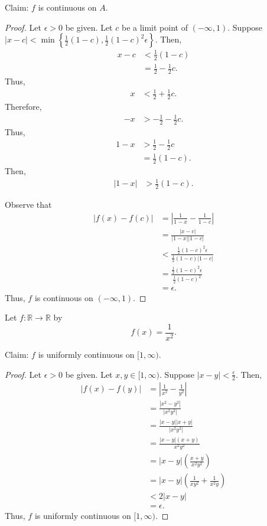 \documentclass[12pt]{article}
\begin{document}
\newpage
{} Claim: $f$ is continuous on $A$.
\begin{proof}
    Let $\epsilon > 0$ be given. Let $c$ be a limit point of $(-\infty, 1)$. Suppose $|x - c| < \min\left\{\frac12(1-c), \frac12(1-c)^2\epsilon\right\}$. Then,
    \begin{align*}
        x - c &< \frac12(1 - c) \\
              &= \frac12 - \frac12c.
    \end{align*} Thus,
    \begin{align*}
        x &< \frac12 + \frac12c.
    \end{align*} Therefore,
    \begin{align*}
        -x &> -\frac12 - \frac12c.
    \end{align*} Thus,
    \begin{align*}
        1 - x &> \frac12 - \frac12c \\
              &= \frac12(1-c).
    \end{align*} Then,
    \begin{align*}
        |1 - x| &> \frac12(1-c).
    \end{align*}

    Observe that
    \begin{align*}
        |f(x) - f(c)| &= \left| \frac1{1-x} - \frac1{1-c} \right| \\
                      &= \frac{|x-c|}{|1-x||1-c|} \\
                      &< \frac{\frac12(1-c)^2\epsilon}{\frac12(1-c)|1-c|} \\
                      &= \frac{\frac12(1-c)^2\epsilon}{\frac12(1-c)^2} \\
                      &= \epsilon.
    \end{align*}
    Thus, $f$ is continuous on $(-\infty, 1)$.

\end{proof}

\newpage
{} Let $f: \mathbb R \to \mathbb R$ by $$f(x) = \frac1{x^2}.$$

\medskip
{} Claim: $f$ is uniformly continuous on $[1,\infty)$.
\begin{proof}
    Let $\epsilon > 0$ be given.
    Let $x, y \in [1, \infty)$.
    Suppose $|x-y| < \frac\epsilon2$.
    Then,
    \begin{align*}
        |f(x) - f(y)| &= \left| \frac1{x^2} - \frac1{y^2} \right| \\
                      &= \frac{|x^2-y^2|}{|x^2y^2|} \\
                      &= \frac{|x-y||x+y|}{|x^2y^2|} \\
                      &= \frac{|x-y|(x+y)}{x^2y^2} \\
                      &= |x-y|\left( \frac{x+y}{x^2y^2} \right) \\
                      &= |x-y|\left( \frac1{xy^2} + \frac1{x^2y} \right) \\
                      &< 2|x-y| \\
                      &= \epsilon.
    \end{align*}
    Thus, $f$ is uniformly continuous on $[1, \infty)$.
\end{proof}
\end{document}
